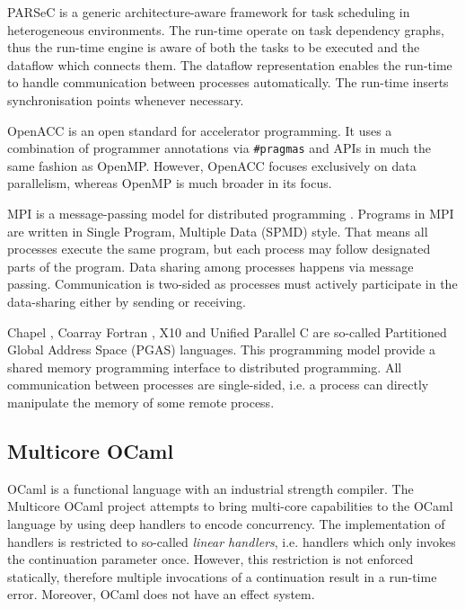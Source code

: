\documentclass[preprint,10pt,numbers]{sigplanconf}
\begin{document}
PARSeC \cite{Bosilca2013} is a generic architecture-aware framework for task scheduling in heterogeneous environments. The run-time operate on task dependency graphs, thus the run-time engine is aware of both the tasks to be executed and the dataflow which connects them. The dataflow representation enables the run-time to handle communication between processes automatically. The run-time inserts synchronisation points whenever necessary.

OpenACC \cite{Openacc2013} is an open standard for accelerator programming. It uses a combination of programmer annotations via \texttt{\#pragmas} and APIs in much the same fashion as OpenMP. However, OpenACC focuses exclusively on data parallelism, whereas OpenMP is much broader in its focus.

MPI is a message-passing model for distributed programming \cite{Mpi2012}. Programs in MPI are written in Single Program, Multiple Data (SPMD) style. That means all processes execute the same program, but each process may follow designated parts of the program. Data sharing among processes happens via message passing. Communication is two-sided as processes must actively participate in the data-sharing either by sending or receiving.

Chapel \cite{Chapel2012}, Coarray Fortran \cite{Reid2005}, X10 \cite{X102015} and Unified Parallel C \cite{Upc2013} are so-called Partitioned Global Address Space (PGAS) languages. This programming model provide a shared memory programming interface to distributed programming. All communication between processes are single-sided, i.e. a process can directly manipulate the memory of some remote process.

\subsection{Multicore OCaml}
OCaml is a functional language with an industrial strength compiler. The Multicore OCaml project \cite{Dolan2015} attempts to bring multi-core capabilities to the OCaml language by using deep handlers to encode concurrency. The implementation of handlers is restricted to so-called \emph{linear handlers}, i.e. handlers which only invokes the continuation parameter once. However, this restriction is not enforced statically, therefore multiple invocations of a continuation result in a run-time error. Moreover, OCaml does not have an effect system.

\end{document}
